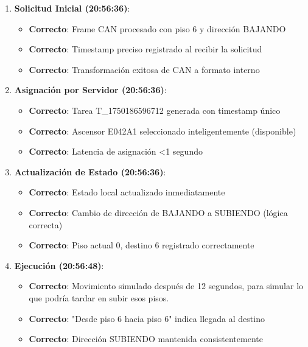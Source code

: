 \begin{enumerate}
    \item \textbf{Solicitud Inicial (20:56:36)}:
    \begin{itemize}
        \item \textcolor{successgreen}{\textbf{Correcto}}: Frame CAN procesado con piso 6 y dirección BAJANDO
        \item \textcolor{successgreen}{\textbf{Correcto}}: Timestamp preciso registrado al recibir la solicitud
        \item \textcolor{successgreen}{\textbf{Correcto}}: Transformación exitosa de CAN a formato interno
    \end{itemize}
    
    \item \textbf{Asignación por Servidor (20:56:36)}:
    \begin{itemize}
        \item \textcolor{successgreen}{\textbf{Correcto}}: Tarea T\_1750186596712 generada con timestamp único
        \item \textcolor{successgreen}{\textbf{Correcto}}: Ascensor E042A1 seleccionado inteligentemente (disponible)
        \item \textcolor{successgreen}{\textbf{Correcto}}: Latencia de asignación <1 segundo
    \end{itemize}
    
    \item \textbf{Actualización de Estado (20:56:36)}:
    \begin{itemize}
        \item \textcolor{successgreen}{\textbf{Correcto}}: Estado local actualizado inmediatamente
        \item \textcolor{successgreen}{\textbf{Correcto}}: Cambio de dirección de BAJANDO a SUBIENDO (lógica correcta)
        \item \textcolor{successgreen}{\textbf{Correcto}}: Piso actual 0, destino 6 registrado correctamente
    \end{itemize}
    
    \item \textbf{Ejecución (20:56:48)}:
    \begin{itemize}
        \item \textcolor{successgreen}{\textbf{Correcto}}: Movimiento simulado después de 12 segundos, para simular lo que podría tardar en subir esos pisos.
        \item \textcolor{successgreen}{\textbf{Correcto}}: "Desde piso 6 hacia piso 6" indica llegada al destino
        \item \textcolor{successgreen}{\textbf{Correcto}}: Dirección SUBIENDO mantenida consistentemente
    \end{itemize}
    

\end{enumerate}
